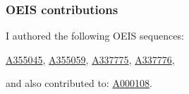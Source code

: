 \documentclass[11pt]{article}
\begin{document}


\subsubsection*{OEIS contributions}
I authored the following OEIS sequences:

\noindent\href{https://oeis.org/A355045}{A355045}, \href{https://oeis.org/A355059}{A355059}, \href{https://oeis.org/A337775}{A337775}, \href{https://oeis.org/A337776}{A337776},

\noindent and also contributed to: \href{https://oeis.org/A000108}{A000108}.


%
%
%
\end{document}
